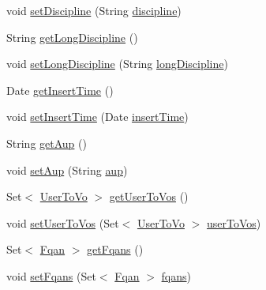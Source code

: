 \begin{DoxyCompactItemize}
\item 
void \hyperlink{classportal_1_1registration_1_1domain_1_1Vo_a3352e54ce4852b93d2537a7f82971827}{setDiscipline} (String \hyperlink{classportal_1_1registration_1_1domain_1_1Vo_ab5ce7543fdba244953f198d31d367723}{discipline})
\item 
String \hyperlink{classportal_1_1registration_1_1domain_1_1Vo_ac67b63493531824b75e1dbccd380973d}{getLongDiscipline} ()
\item 
void \hyperlink{classportal_1_1registration_1_1domain_1_1Vo_a65306f888c40b3c4366a607970aad55b}{setLongDiscipline} (String \hyperlink{classportal_1_1registration_1_1domain_1_1Vo_ace2d40b5322f647c70ba092e468edaec}{longDiscipline})
\item 
Date \hyperlink{classportal_1_1registration_1_1domain_1_1Vo_a23b2eb4578d455128fb28c85f4d2a157}{getInsertTime} ()
\item 
void \hyperlink{classportal_1_1registration_1_1domain_1_1Vo_a1317d8976e1326425ece76d0cf21a2b0}{setInsertTime} (Date \hyperlink{classportal_1_1registration_1_1domain_1_1Vo_a151311e5b51385dffb6d6d207159ac65}{insertTime})
\item 
String \hyperlink{classportal_1_1registration_1_1domain_1_1Vo_a81c5e06f245e628f8ef9772d1496cf33}{getAup} ()
\item 
void \hyperlink{classportal_1_1registration_1_1domain_1_1Vo_a0a230eaaf27061f162ae499bd35b03f7}{setAup} (String \hyperlink{classportal_1_1registration_1_1domain_1_1Vo_af69ab6e7d6a8c9d628bea1a85e3c27d3}{aup})
\item 
Set$<$ \hyperlink{classportal_1_1registration_1_1domain_1_1UserToVo}{UserToVo} $>$ \hyperlink{classportal_1_1registration_1_1domain_1_1Vo_a57a462f8816de014567ba8252c012c15}{getUserToVos} ()
\item 
void \hyperlink{classportal_1_1registration_1_1domain_1_1Vo_a9fbb106daee5c6e94af97ba54437a30a}{setUserToVos} (Set$<$ \hyperlink{classportal_1_1registration_1_1domain_1_1UserToVo}{UserToVo} $>$ \hyperlink{classportal_1_1registration_1_1domain_1_1Vo_a643d30daf36de4c59c48ce381f5ca18d}{userToVos})
\item 
Set$<$ \hyperlink{classportal_1_1registration_1_1domain_1_1Fqan}{Fqan} $>$ \hyperlink{classportal_1_1registration_1_1domain_1_1Vo_a4ffa79bc0565f6b532223ce1e85e689c}{getFqans} ()
\item 
void \hyperlink{classportal_1_1registration_1_1domain_1_1Vo_a5263b011e85511093e05cdc6c57058af}{setFqans} (Set$<$ \hyperlink{classportal_1_1registration_1_1domain_1_1Fqan}{Fqan} $>$ \hyperlink{classportal_1_1registration_1_1domain_1_1Vo_ac9fbb476da6a7943923272ceaee88bf8}{fqans})
\end{DoxyCompactItemize}
